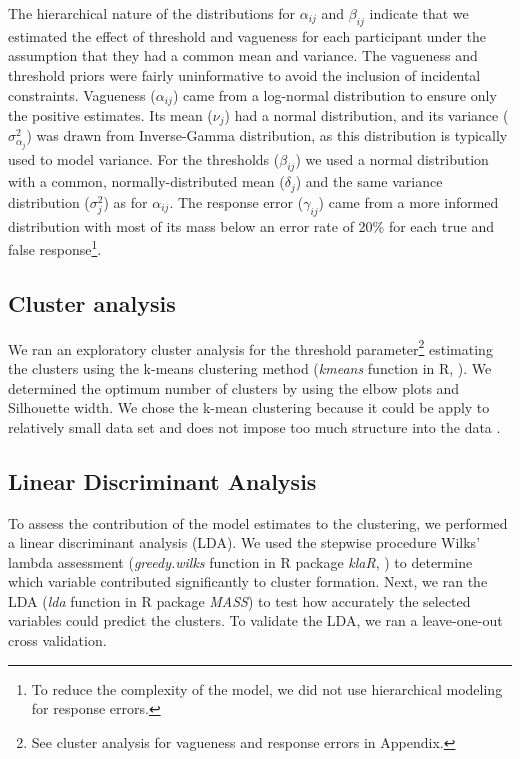\documentclass{article}
\begin{document}
The hierarchical nature of the distributions for $\alpha_{ij}$ and $\beta_{ij}$ indicate that we estimated the effect of threshold and vagueness for each participant under the assumption that they had a common mean and variance. The vagueness and threshold priors were fairly uninformative to avoid the inclusion of incidental constraints. Vagueness ($\alpha_{ij}$) came from a log-normal distribution to ensure only the positive estimates. Its mean ($\nu_j$) had a normal distribution, and its variance ($\sigma^2_{\alpha_j}$) was drawn from Inverse-Gamma distribution, as this distribution is typically used to model variance. For the thresholds ($\beta_{ij}$) we used a normal distribution with a common, normally-distributed mean ($\delta_j$) and the same variance distribution ($\sigma^2_j$) as for $\alpha_{ij}$. The response error ($\gamma_{ij}$) came from a more informed distribution with most of its mass below an error rate of 20\% for each true and false response\footnote{To reduce the complexity of the model, we did not use hierarchical modeling for response errors.}. 

\subsection{Cluster analysis}
We ran an exploratory cluster analysis for the threshold parameter\footnote{See cluster analysis for vagueness and response errors in Appendix.} estimating the clusters using the k-means clustering method (\textit{kmeans} function in R, ). We determined the optimum number of clusters by using the elbow plots and Silhouette width. We chose the k-mean clustering because it could be apply to relatively small data set and does not impose too much structure into the data \cite{Weigand2021}.

\subsection{Linear Discriminant Analysis}
To assess the contribution of the model estimates to the clustering, we performed a linear discriminant analysis (LDA). We used the stepwise procedure Wilks' lambda assessment (\textit{greedy.wilks} function in R package \textit{klaR}, ) to determine which variable contributed significantly to cluster formation. Next, we ran the LDA (\textit{lda} function in R package \textit{MASS}) to test how accurately the selected variables could predict the clusters. To validate the LDA, we ran a leave-one-out cross validation.
\end{document}
